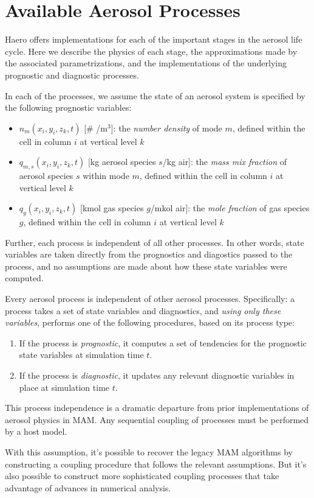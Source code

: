 \chapter{Available Aerosol Processes}

Haero offers implementations for each of the important stages in the aerosol
life cycle. Here we describe the physics of each stage, the approximations
made by the associated parametrizations, and the implementations of the
underlying prognostic and diagnostic processes.

In each of the processes, we assume the state of an aerosol system is specified
by the following prognostic variables:

\begin{itemize}
  \item $ n_m(x_i, y_i, z_k, t)$ [\# /m$^3$]: the {\em number density} of mode $m$,
        defined within the cell in column $i$ at vertical level $k$
  \item $ q_{m,s}(x_i, y_i, z_k, t)$ [kg aerosol species $s$/kg air]: the
        {\em mass mix fraction} of aerosol species $s$ within mode $m$, defined
        within the cell in column $i$ at vertical level $k$
  \item $ q_g(x_i, y_i, z_k, t)$ [kmol gas species $g$/mkol air]: the {\em mole
        fraction} of gas species $g$, defined within the cell in column $i$ at
        vertical level $k$
\end{itemize}

Further, each process is independent of all other processes. In other words,
state variables are taken directly from the prognostics and diagostics passed
to the process, and no assumptions are made about how these state variables
were computed.

\begin{assume}
  Every aerosol process is independent of other aerosol processes. Specifically:
  a process takes a set of state variables and diagnostics, and {\em using only
  these variables}, performs one of the following procedures, based on its
  process type:
  \begin{enumerate}
    \item If the process is {\em prognostic}, it computes a set of tendencies
          for the prognostic state variables at simulation time $t$.
    \item If the process is {\em diagnostic}, it updates any relevant diagnostic
          variables in place at simulation time $t$.
  \end{enumerate}
\end{assume}

This process independence is a dramatic departure from prior implementations of
aerosol physics in MAM. Any sequential coupling of processes must be performed
by a host model.

With this assumption, it's possible to recover the legacy MAM algorithms by
constructing a coupling procedure that follows the relevant assumptions. But
it's also possible to construct more sophisticated coupling processes that take
advantage of advances in numerical analysis.


